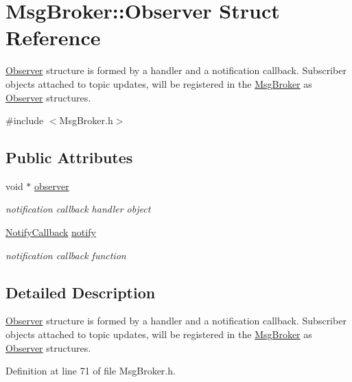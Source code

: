 \hypertarget{struct_msg_broker_1_1_observer}{\section{Msg\-Broker\-:\-:Observer Struct Reference}
\label{struct_msg_broker_1_1_observer}
}


\hyperlink{struct_msg_broker_1_1_observer}{Observer} structure is formed by a handler and a notification callback. Subscriber objects attached to topic updates, will be registered in the \hyperlink{class_msg_broker}{Msg\-Broker} as \hyperlink{struct_msg_broker_1_1_observer}{Observer} structures.  




{\ttfamily \#include $<$Msg\-Broker.\-h$>$}

\subsection*{Public Attributes}
\begin{DoxyCompactItemize}
\item 
void $\ast$ \hyperlink{struct_msg_broker_1_1_observer_a7999f6189d65b41fb3c60a0d90b93de7}{observer}
\begin{DoxyCompactList}\small\item\em notification callback handler object \end{DoxyCompactList}\item 
\hyperlink{class_msg_broker_a830cd79418898c03e6b144b1e47d68d1}{Notify\-Callback} \hyperlink{struct_msg_broker_1_1_observer_aaa03c3efb2eae0b13212b9e11a47754b}{notify}
\begin{DoxyCompactList}\small\item\em notification callback function \end{DoxyCompactList}\end{DoxyCompactItemize}


\subsection{Detailed Description}
\hyperlink{struct_msg_broker_1_1_observer}{Observer} structure is formed by a handler and a notification callback. Subscriber objects attached to topic updates, will be registered in the \hyperlink{class_msg_broker}{Msg\-Broker} as \hyperlink{struct_msg_broker_1_1_observer}{Observer} structures. 

Definition at line 71 of file Msg\-Broker.\-h.



